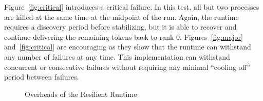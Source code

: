 \documentclass{llncs}
\begin{document}
Figure~\ref{fig:critical} introduces a critical failure. In this test,
all but two processes are killed at the same time at the midpoint of
the run. Again, the runtime requires a discovery period before
stabilizing, but it is able to recover and continue delivering the
remaining tokens back to rank 0. Figures~\ref{fig:major}
and~\ref{fig:critical} are encouraging as they show that the runtime
can withstand any number of failures at any time. This implementation
can withstand concurrent or consecutive failures without requiring any
minimal ``cooling off'' period between failures.

\begin{figure}[t]
  \centering
  \caption{Overheads of the Resilient Runtime}\label{fig:overheads}
\end{figure}
\end{document}
